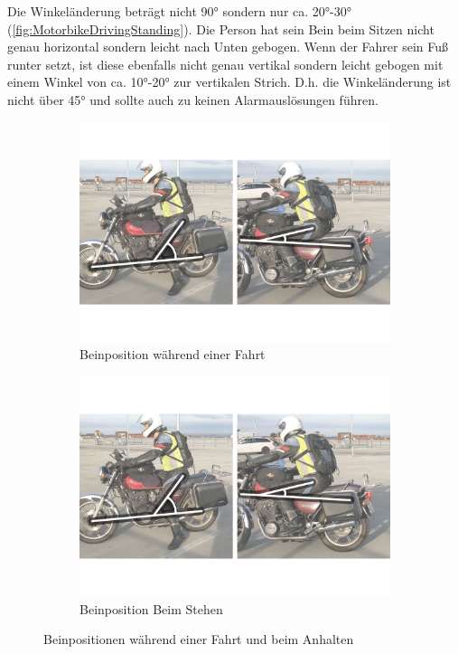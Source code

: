 Die Winkeländerung beträgt nicht \ang{90} sondern nur ca. \ang{20}-\ang{30} (\autoref{fig:MotorbikeDrivingStanding}). Die Person hat sein Bein beim Sitzen nicht genau horizontal sondern leicht nach Unten gebogen. Wenn der Fahrer sein Fuß runter setzt, ist diese ebenfalls nicht genau vertikal sondern leicht gebogen mit einem Winkel von ca. \ang{10}-\ang{20} zur vertikalen Strich. D.h. die Winkeländerung ist nicht über \ang{45} und sollte auch zu keinen Alarmauslösungen führen.

\begin{figure}
	\centering
	\begin{subfigure}{0.48\textwidth}
		\centering
		\includegraphics[width=\textwidth]{Bilder/0_Beinposition_Anhalten_Fahren.pdf}
		\caption{Beinposition während einer Fahrt}
		\label{fig:MotorbikeDriving}
	\end{subfigure}
	\hfill
	\begin{subfigure}{0.48\textwidth}
		\centering
		\includegraphics[width=\textwidth]{Bilder/0_Beinposition_Anhalten_Stehen.pdf}
		\caption{Beinposition Beim Stehen}
		\label{fig:MotorbikeStanding2}
	\end{subfigure}
	\caption{Beinpositionen während einer Fahrt und beim Anhalten}
	\label{fig:MotorbikeDrivingStanding}
\end{figure}


 